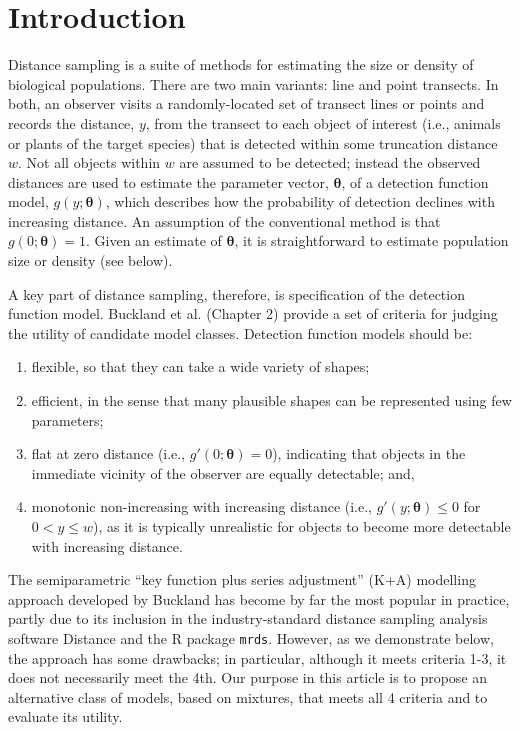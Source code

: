 \documentclass[10pt]{article}
\begin{document}
\section*{Introduction}

Distance sampling \cite{Buckland:2001vm,Buckland:2004ts} is a suite of methods for estimating the size or density of biological populations.  There are two main variants: line and point transects. In both, an observer visits a randomly-located set of transect lines or points and records the distance, $y$, from the transect to each object of interest (i.e., animals or plants of the target species) that is detected within some truncation distance $w$.  Not all objects within $w$ are assumed to be detected; instead the observed distances are used to estimate the parameter vector, $\mathbf{\theta}$, of a detection function model, $g(y;\mathbf{\theta})$, which describes how the probability of detection declines with increasing distance.  An assumption of the conventional method is that $g(0;\mathbf{\theta})=1$. Given an estimate of $\mathbf{\theta}$, it is straightforward to estimate population size or density (see below).

A key part of distance sampling, therefore, is specification of the detection function model. Buckland et al. (Chapter 2) \cite{Buckland:2001vm} provide a set of criteria for judging the utility of candidate model classes. Detection function models should be:
\begin{enumerate}
\item flexible, so that they can take a wide variety of shapes;
\item efficient, in the sense that many plausible shapes can be represented using few parameters;
\item flat at zero distance (i.e., $g'(0;\mathbf{\theta})=0$), indicating that objects in the immediate vicinity of the observer are equally detectable; and,
\item monotonic non-increasing with increasing distance (i.e., $g'(y;\mathbf{\theta}) \leq 0$ for $0<y\leq w$), as it is typically unrealistic for objects to become more detectable with increasing distance.
\end{enumerate}
The semiparametric ``key function plus series adjustment'' (K+A) modelling approach developed by Buckland \cite{Buckland:1992wy} has become by far the most popular in practice, partly due to its inclusion in the industry-standard distance sampling analysis software Distance \cite{Thomas:2010cf} and the \textsf{R} package \texttt{mrds}.  However, as we demonstrate below, the approach has some drawbacks; in particular, although it meets criteria 1-3, it does not necessarily meet the 4th.  Our purpose in this article is to propose an alternative class of models, based on mixtures, that meets all 4 criteria and to evaluate its utility.  
\end{document}
